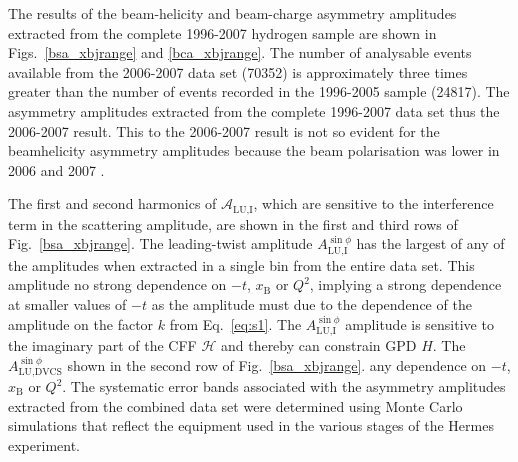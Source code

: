 The results of the beam-helicity and beam-charge asymmetry amplitudes extracted from the complete 1996-2007 hydrogen sample are shown in Figs.~\ref{bsa_xbjrange} and \ref{bca_xbjrange}. The number of analysable events available from the 2006-2007 data set (70352) is approximately three times greater than the number of events recorded in the 1996-2005 sample (24817). The  asymmetry amplitudes extracted from the complete 1996-2007 data set thus  the 2006-2007 result. This  to the 2006-2007 result is not so evident for the beam\red{-}helicity asymmetry amplitudes because the beam polarisation was lower in 2006 and 2007 .

The first and second harmonics of $\mathcal{A}_{\textrm{LU,I}}$, which are
sensitive to the interference term in the scattering amplitude, are shown in the first and third rows of Fig.~\ref{bsa_xbjrange}. The leading-twist amplitude $A_{\textrm{LU,I}}^{\sin\phi}$ has the largest  of any of the amplitudes when extracted in a single bin from the entire data set. This amplitude  no strong dependence on $-t$, $x_{\textrm{B}}$ or $Q^{2}$, implying a strong dependence at smaller values of $-t$ as the amplitude must  due to the dependence of the amplitude on the factor $k$ from Eq.~\ref{eq:s1}. The $A_{\textrm{LU,I}}^{\sin\phi}$ amplitude is sensitive to the imaginary part of the CFF $\mathcal{H}$ and thereby can constrain GPD $\textit{H}$. The $A_{\textrm{LU,DVCS}}^{\sin\phi}$  shown in the second row of Fig.~\ref{bsa_xbjrange}.  any dependence on $-t$, $x_{\textrm{B}}$ or $Q^{2}$. The systematic error bands associated with the asymmetry amplitudes extracted from the combined data set were determined using Monte Carlo simulations that reflect the equipment used in the various stages of the H{\sc ermes} experiment. 

